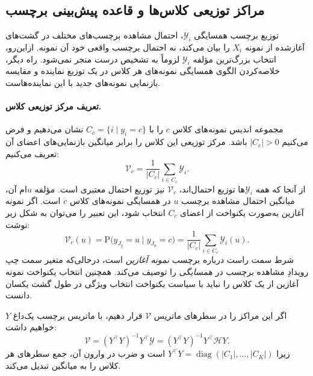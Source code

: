 \subsection{مراکز توزیعی کلاس‌ها و قاعده پیش‌بینی برچسب}
\label{subsec:ch3-class-centers}
توزیع برچسب همسایگی $\mathscr Y_i$، احتمال مشاهده برچسب‌های مختلف در گشت‌های آغازشده از نمونه $X_i$ را بیان می‌کند، نه احتمال برچسب واقعی خود آن نمونه. ازاین‌رو، انتخاب بزرگ‌ترین مؤلفه $\mathscr Y_i$ لزوماً به تشخیص درست منجر نمی‌شود. راه دیگر، خلاصه‌کردن الگوی همسایگی نمونه‌های هر کلاس در یک توزیع نماینده و مقایسه بازنمایی نمونه‌های جدید با این نماینده‌هاست.

\paragraph{تعریف مرکز توزیعی کلاس.}
مجموعه اندیس نمونه‌های کلاس $c$ را با $C_c=\{i\mid y_i=c\}$ نشان می‌دهیم و فرض می‌کنیم $|C_c|>0$ باشد. مرکز توزیعی این کلاس را برابر میانگین بازنمایی‌های اعضای آن تعریف می‌کنیم:
\begin{equation}\label{eq:ch3-class-center}
\boxed{\mathcal V_c=\frac{1}{|C_c|}\sum_{i\in C_c}\mathscr Y_i.}
\end{equation}
از آنجا که همه $\mathscr Y_i$ها توزیع احتمال‌اند، $\mathcal V_c$ نیز توزیع احتمال معتبری است. مؤلفه $u$ام آن، میانگین احتمال مشاهده برچسب $u$ در همسایگی نمونه‌های کلاس $c$ است. اگر نمونه آغازین به‌صورت یکنواخت از اعضای $C_c$ انتخاب شود، این تعبیر را می‌توان به شکل زیر نوشت:
\begin{equation}\label{eq:ch3-class-center-prob}
\boxed{\mathcal V_c(u)=
\mathrm P\bigl(y_{J_\xi}=u\mid y_{J_0}=c\bigr)
=\frac{1}{|C_c|}\sum_{i\in C_c}\mathscr Y_i(u).}
\end{equation}
شرط سمت راست درباره برچسب \emph{نمونه آغازین} است، درحالی‌که متغیر سمت چپ رویدادِ مشاهده برچسب در \emph{همسایگی} را توصیف می‌کند. همچنین انتخاب یکنواخت نمونه آغازین از یک کلاس را نباید با سیاست یکنواخت انتخاب ویژگی در طول گشت یکسان دانست.

اگر این مراکز را در سطرهای ماتریس $\mathcal V$ قرار دهیم، با ماتریس برچسب یک‌داغ $Y$ خواهیم داشت:
\begin{equation}\label{eq:ch3-class-centers-matrix}
\boxed{\mathcal V=(Y^\top Y)^{-1}Y^\top\mathscr Y
=(Y^\top Y)^{-1}Y^\top\mathscr H Y.}
\end{equation}
زیرا $Y^\top Y=\operatorname{diag}(|C_1|,\ldots,|C_K|)$ است و ضرب در وارون آن، جمع سطرهای هر کلاس را به میانگین تبدیل می‌کند.

